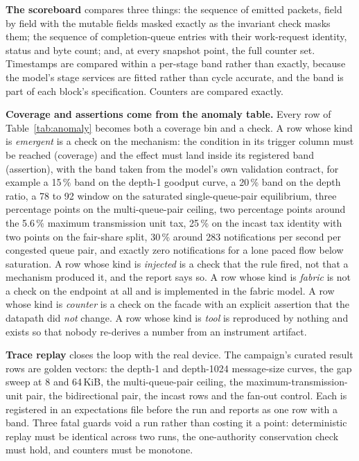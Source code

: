 \textbf{The scoreboard} compares three things: the sequence of emitted packets,
field by field with the mutable fields masked exactly as the invariant check
masks them; the sequence of completion-queue entries with their work-request
identity, status and byte count; and, at every snapshot point, the full counter
set. Timestamps are compared within a per-stage band rather than exactly,
because the model's stage services are fitted rather than cycle accurate, and
the band is part of each block's specification. Counters are compared exactly.

\textbf{Coverage and assertions come from the anomaly table.} Every row of
Table~\ref{tab:anomaly} becomes both a coverage bin and a check.
A row whose kind is \textit{emergent} is a check on the mechanism: the
condition in its trigger column must be reached (coverage) and the effect must
land inside its registered band (assertion), with the band taken from the
model's own validation contract, for example a 15\,\% band on the depth-1
goodput curve, a 20\,\% band on the depth ratio, a 78 to 92\Gbps{} window on
the saturated single-queue-pair equilibrium, three percentage points on the
multi-queue-pair ceiling, two percentage points around the 5.6\,\% maximum
transmission unit tax, 25\,\% on the incast tax identity with two points on the
fair-share split, 30\,\% around 283 notifications per second per congested
queue pair, and exactly zero notifications for a lone paced flow below
saturation. A row whose kind is \textit{injected} is a check that the rule
fired, not that a mechanism produced it, and the report says so. A row whose
kind is \textit{fabric} is not a check on the endpoint at all and is
implemented in the fabric model. A row whose kind is \textit{counter} is a
check on the facade with an explicit assertion that the datapath did
\emph{not} change. A row whose kind is \textit{tool} is reproduced by nothing
and exists so that nobody re-derives a number from an instrument artifact.

\textbf{Trace replay} closes the loop with the real device. The campaign's
curated result rows are golden vectors: the depth-1 and depth-1024 message-size
curves, the gap sweep at 8 and 64\,KiB, the multi-queue-pair ceiling, the
maximum-transmission-unit pair, the bidirectional pair, the incast rows and the
fan-out control. Each is registered in an expectations file before the run and
reports as one row with a band. Three fatal guards void a run rather than
costing it a point: deterministic replay must be identical across two runs,
the one-authority conservation check must hold, and counters must be monotone.

